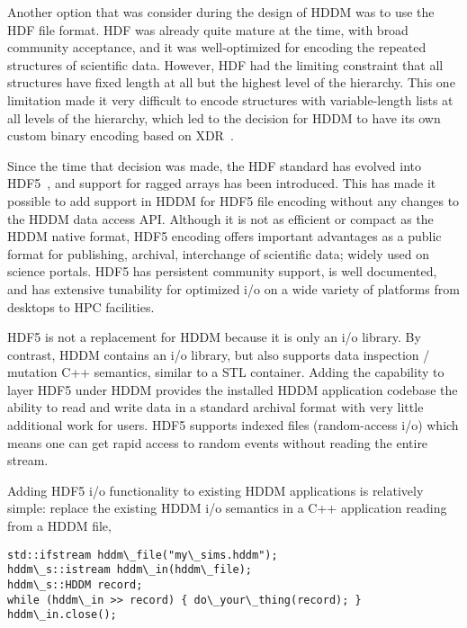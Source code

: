 \documentclass{revtex4}
\begin{document}
Another option that was consider during the design of HDDM was to use
the HDF file format. HDF was already quite mature at the time, with broad
community acceptance, and it was well-optimized for encoding the repeated
structures of scientific data. However, HDF had the limiting constraint
that all structures have fixed length at all but the highest level of
the hierarchy. This one limitation made it very difficult to encode
structures with variable-length lists at all levels of the hierarchy,
which led to the decision for HDDM to have its own custom binary encoding
based on XDR~\cite{xdr}.

Since the time that decision was made, the HDF standard has evolved into
HDF5~\cite{hdf5}, and support for ragged arrays has been introduced. This
has made it possible to add support in HDDM for HDF5 file encoding without
any changes to the HDDM data access API. Although it is not as efficient
or compact as the HDDM native format, HDF5 encoding offers important
advantages as a public format for publishing, archival, interchange of
scientific data; widely used on science portals. HDF5 has persistent
community support, is well documented, and has extensive tunability
for optimized i/o on a wide variety of platforms from desktops to HPC
facilities. 

HDF5 is not a replacement for HDDM because it is only an i/o library.
By contrast, HDDM contains an i/o library, but also supports data inspection
/ mutation C++ semantics, similar to a STL container. Adding the capability
to layer HDF5 under HDDM provides the installed HDDM application codebase
the ability to read and write data in a standard archival format with very
little additional work for users. HDF5 supports indexed files (random-access
i/o) which means one can get rapid access to random events without reading
the entire stream. 

Adding HDF5 i/o functionality to existing HDDM applications is relatively 
simple: replace the existing HDDM i/o semantics in a C++ application reading
from a HDDM file,

\vspace{0.5cm}
\begin{minipage}{12cm}
\begin{verbatim}
std::ifstream hddm\_file("my\_sims.hddm");
hddm\_s::istream hddm\_in(hddm\_file);
hddm\_s::HDDM record;
while (hddm\_in >> record) { do\_your\_thing(record); }
hddm\_in.close();
\end{verbatim}
\end{minipage}
\vspace{0.5cm}
\end{document}
